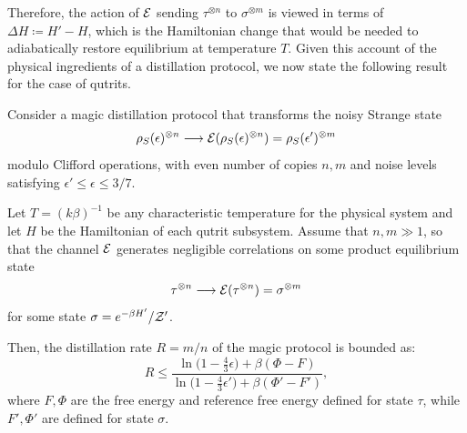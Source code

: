 \documentclass[pra,
aps,
twocolumn,
superscriptaddress,
groupedaddress,
nofootinbib,
reprint
]{revtex4-1}
\begin{document}
Therefore, the action of ${\mathcal E}$ sending $\tau^{\otimes n}$ to $\sigma^{\otimes m}$ is viewed in terms of $\Delta H \coloneqq H'-H$, which is the Hamiltonian change that would be needed to adiabatically restore equilibrium at temperature $T$.
Given this account of the physical ingredients of a distillation protocol, we now state the following result for the case of qutrits.
\begin{theorem}\label{thm:free-energy}
	Consider a magic distillation protocol that transforms the noisy Strange state
	\begin{equation*}
		\rho_S(\epsilon)^{\otimes n} \longrightarrow {\mathcal E}(\rho_S(\epsilon)^{\otimes n})=\rho_S(\epsilon')^{\otimes m} 
	\end{equation*}
modulo Clifford operations, with even number of copies $n, m$ and noise levels satisfying $\epsilon' \leq \epsilon \leq 3/7$.

Let $T =(k\beta)^{-1}$ be any characteristic temperature for the physical system and let $H$ be the Hamiltonian of each qutrit subsystem.
Assume that $n,m \gg 1$, so that the channel ${\mathcal E}$ generates negligible correlations on some product equilibrium state 
\begin{equation}
	\tau^{\otimes n} \longrightarrow {\mathcal E}(\tau^{\otimes n}) = \sigma^{\otimes m}
\end{equation} 
for some state $\sigma = e^{-\beta H'}/\mathcal{Z}'$.

Then, the distillation rate $R = m/n$ of the magic protocol is bounded as:
\begin{equation}\label{eq:rate_bounds_proof}
	R \leq \dfrac{\ln{\big( 1-\frac{4}{3}\epsilon \big)} + \beta (\Phi - F)}{\ln{\big( 1-\frac{4}{3}\epsilon' \big)} + \beta (\Phi' - F')},
\end{equation}
where $F, \Phi$ are the free energy and reference free energy defined for state $\tau$, while $F', \Phi'$ are defined for state $\sigma$.
\end{theorem}
\end{document}
